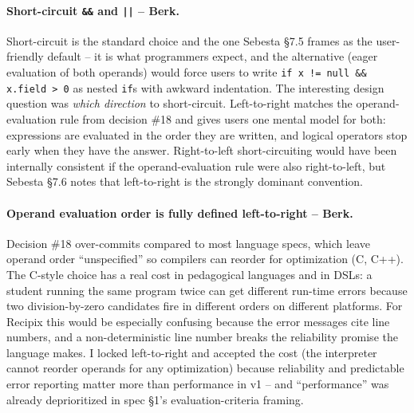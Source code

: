 \documentclass[11pt,a4paper]{article}
\begin{document}
\paragraph{Short-circuit \texttt{\&\&} and \texttt{||} -- Berk.}
Short-circuit is the standard choice and the one Sebesta \S7.5 frames
as the user-friendly default -- it is what programmers expect, and the
alternative (eager evaluation of both operands) would force users to
write \texttt{if x != null \&\& x.field > 0} as nested \texttt{if}s
with awkward indentation. The interesting design question was
\emph{which direction} to short-circuit. Left-to-right matches the
operand-evaluation rule from decision \#18 and gives users one mental
model for both: expressions are evaluated in the order they are
written, and logical operators stop early when they have the answer.
Right-to-left short-circuiting would have been internally consistent
if the operand-evaluation rule were also right-to-left, but Sebesta
\S7.6 notes that left-to-right is the strongly dominant convention.

\paragraph{Operand evaluation order is fully defined left-to-right -- Berk.}
Decision \#18 over-commits compared to most language specs, which
leave operand order ``unspecified'' so compilers can reorder for
optimization (C, C++). The C-style choice has a real cost in
pedagogical languages and in DSLs: a student running the same program
twice can get different run-time errors because two division-by-zero
candidates fire in different orders on different platforms. For
Recipix this would be especially confusing because the error messages
cite line numbers, and a non-deterministic line number breaks the
reliability promise the language makes. I locked left-to-right and
accepted the cost (the interpreter cannot reorder operands for any
optimization) because reliability and predictable error reporting
matter more than performance in v1 -- and ``performance'' was already
deprioritized in spec \S1's evaluation-criteria framing.
\end{document}
